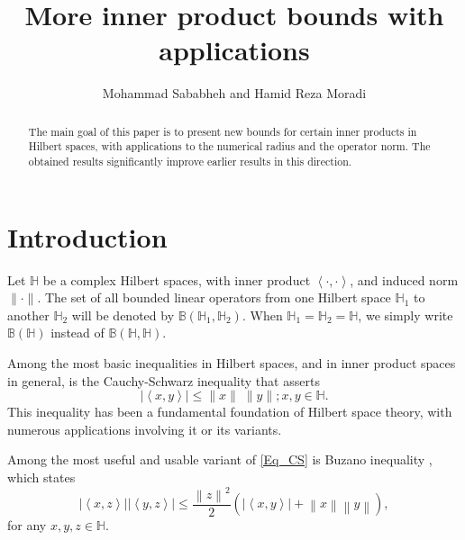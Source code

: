 \documentclass[12pt,twoside,reqno]{amsart}
\numberwithin{equation}{section}
\begin{document}
\title{More inner product bounds with applications}
\author{Mohammad Sababheh and Hamid Reza Moradi}

\begin{abstract}
The main goal of this paper is to present new bounds for certain inner products in Hilbert spaces, with applications to the numerical radius and the operator norm. The obtained results significantly improve earlier results in this direction.
\end{abstract}

\maketitle

\pagestyle{myheadings} \markboth{\centerline{}}
{\centerline{}} \bigskip \bigskip 

\section{Introduction}
Let $\mathbb{H}$ be a complex Hilbert spaces, with inner product $\left<\cdot,\cdot\right>$, and induced norm $\|\cdot\|$. The set of all bounded linear operators from one Hilbert space $\mathbb{H}_1$ to another $\mathbb{H}_2$ will be denoted by $\mathbb{B}(\mathbb{H}_1,\mathbb{H}_2).$ When $\mathbb{H}_1=\mathbb{H}_2=\mathbb{H}$, we simply write $\mathbb{B}(\mathbb{H})$ instead of $\mathbb{B}(\mathbb{H},\mathbb{H})$.

Among the most basic inequalities in Hilbert spaces, and in inner product spaces in general, is the Cauchy-Schwarz inequality that asserts 
\begin{equation}\label{Eq_CS}
|\left<x,y\right>|\leq \|x\|\;\|y\|; x,y\in\mathbb{H}.
\end{equation}
This inequality has been a fundamental foundation of Hilbert space theory, with numerous applications involving it or its variants.

Among the most useful and usable variant of \eqref{Eq_CS} is Buzano inequality \cite{bu}, which  states
\begin{equation}\label{Eq_Buz}
\left| \left\langle x,z \right\rangle  \right|\left| \left\langle y,z \right\rangle  \right|\le \frac{{{\left\| z \right\|}^{2}}}{2}\left( \left| \left\langle x,y \right\rangle  \right|+\left\| x \right\|\left\| y \right\| \right),
\end{equation}
for any $x,y,z\in \mathbb{H}$.
\end{document}
